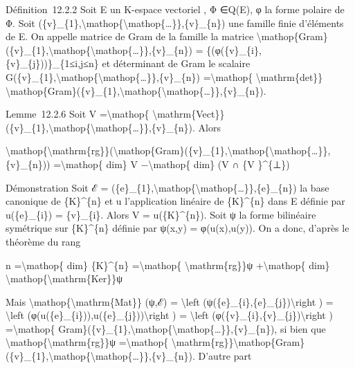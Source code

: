 \documentclass[]{article}
\begin{document}
Définition~12.2.2 Soit E un K-espace vectoriel , Φ ∈Q(E), φ la forme
polaire de Φ. Soit
(\{v\}\_\{1\},\textbackslash{}mathop\{\textbackslash{}mathop\{\ldots{}\}\},\{v\}\_\{n\})
une famille finie d'éléments de E. On appelle matrice de Gram de la
famille la matrice
\textbackslash{}mathop\{Gram\}(\{v\}\_\{1\},\textbackslash{}mathop\{\textbackslash{}mathop\{\ldots{}\}\},\{v\}\_\{n\})
= \{(φ(\{v\}\_\{i\},\{v\}\_\{j\}))\}\_\{1≤i,j≤n\} et déterminant de Gram
le scalaire
G(\{v\}\_\{1\},\textbackslash{}mathop\{\textbackslash{}mathop\{\ldots{}\}\},\{v\}\_\{n\})
=\textbackslash{}mathop\{ \textbackslash{}mathrm\{det\}\}
\textbackslash{}mathop\{Gram\}(\{v\}\_\{1\},\textbackslash{}mathop\{\textbackslash{}mathop\{\ldots{}\}\},\{v\}\_\{n\}).

Lemme~12.2.6 Soit V =\textbackslash{}mathop\{
\textbackslash{}mathrm\{Vect\}\}(\{v\}\_\{1\},\textbackslash{}mathop\{\textbackslash{}mathop\{\ldots{}\}\},\{v\}\_\{n\}).
Alors

\textbackslash{}mathop\{\textbackslash{}mathrm\{rg\}\}(\textbackslash{}mathop\{Gram\}(\{v\}\_\{1\},\textbackslash{}mathop\{\textbackslash{}mathop\{\ldots{}\}\},\{v\}\_\{n\}))
=\textbackslash{}mathop\{ dim\} V −\textbackslash{}mathop\{ dim\} (V ∩
\{V \}\^{}\{⊥\})

Démonstration Soit ℰ =
(\{e\}\_\{1\},\textbackslash{}mathop\{\textbackslash{}mathop\{\ldots{}\}\},\{e\}\_\{n\})
la base canonique de \{K\}\^{}\{n\} et u l'application linéaire de
\{K\}\^{}\{n\} dans E définie par u(\{e\}\_\{i\}) = \{v\}\_\{i\}. Alors
V = u(\{K\}\^{}\{n\}). Soit ψ la forme bilinéaire symétrique sur
\{K\}\^{}\{n\} définie par ψ(x,y) = φ(u(x),u(y)). On a donc, d'après le
théorème du rang

n =\textbackslash{}mathop\{ dim\} \{K\}\^{}\{n\}
=\textbackslash{}mathop\{ \textbackslash{}mathrm\{rg\}\}ψ
+\textbackslash{}mathop\{ dim\}
\textbackslash{}mathop\{\textbackslash{}mathrm\{Ker\}\}ψ

Mais \textbackslash{}mathop\{\textbackslash{}mathrm\{Mat\}\} (ψ,ℰ) =
\textbackslash{}left (ψ(\{e\}\_\{i\},\{e\}\_\{j\})\textbackslash{}right
) = \textbackslash{}left
(φ(u(\{e\}\_\{i\})),u(\{e\}\_\{j\}))\textbackslash{}right ) =
\textbackslash{}left (φ(\{v\}\_\{i\},\{v\}\_\{j\})\textbackslash{}right
) =\textbackslash{}mathop\{
Gram\}(\{v\}\_\{1\},\textbackslash{}mathop\{\textbackslash{}mathop\{\ldots{}\}\},\{v\}\_\{n\}),
si bien que \textbackslash{}mathop\{\textbackslash{}mathrm\{rg\}\}ψ
=\textbackslash{}mathop\{
\textbackslash{}mathrm\{rg\}\}\textbackslash{}mathop\{Gram\}(\{v\}\_\{1\},\textbackslash{}mathop\{\textbackslash{}mathop\{\ldots{}\}\},\{v\}\_\{n\}).
D'autre part
\end{document}
